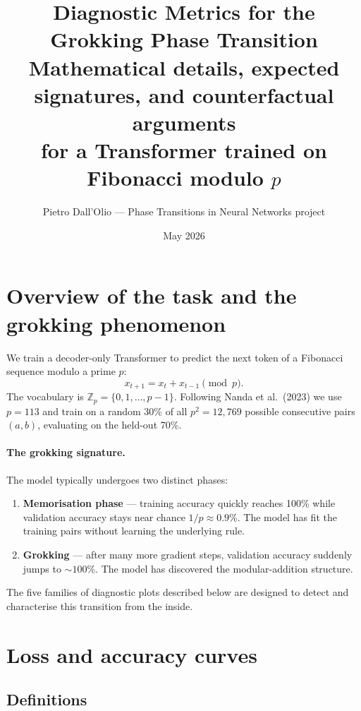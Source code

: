\documentclass[11pt]{article}
\title{Diagnostic Metrics for the Grokking Phase Transition\\[4pt]
\large Mathematical details, expected signatures, and counterfactual arguments\\
for a Transformer trained on Fibonacci modulo $p$}
\author{Pietro Dall'Olio --- Phase Transitions in Neural Networks project}
\date{May 2026}
\newcommand{\Zp}{\mathbb{Z}_p}
\begin{document}
\maketitle
\tableofcontents
\newpage

\section{Overview of the task and the grokking phenomenon}

We train a decoder-only Transformer to predict the next token of a Fibonacci
sequence modulo a prime $p$:
\begin{equation}
    x_{t+1} = x_t + x_{t-1} \pmod{p}.
\end{equation}
The vocabulary is $\Zp = \{0,1,\dots,p-1\}$.
Following Nanda et al.\ (2023) we use $p = 113$ and train on a random
30\% of all $p^2 = 12{,}769$ possible consecutive pairs $(a, b)$, evaluating
on the held-out 70\%.

\paragraph{The grokking signature.}
The model typically undergoes two distinct phases:
\begin{enumerate}[label=(\roman*)]
    \item \textbf{Memorisation phase} --- training accuracy quickly reaches 100\%
    while validation accuracy stays near chance $1/p \approx 0.9\%$.
    The model has fit the training pairs without learning the underlying rule.
    \item \textbf{Grokking} --- after many more gradient steps, validation accuracy
    suddenly jumps to $\sim 100\%$.
    The model has discovered the modular-addition structure.
\end{enumerate}
The five families of diagnostic plots described below are designed to detect and
characterise this transition from the inside.

\section{Loss and accuracy curves}
\label{sec:loss}

\subsection{Definitions}
\end{document}
